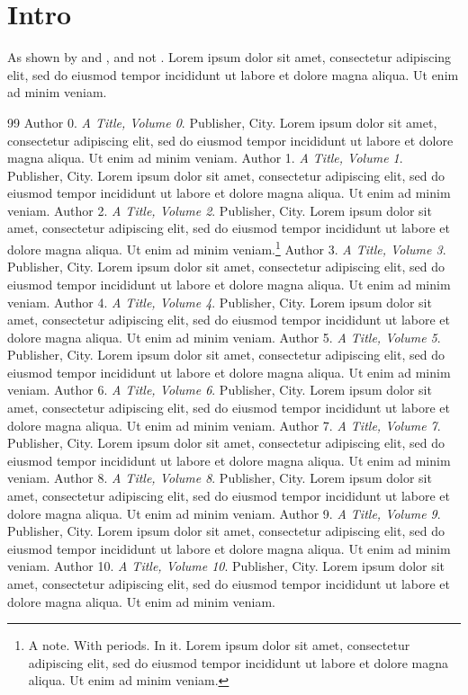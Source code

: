 \documentclass{article}
\begin{document}
\section{Intro}
As shown by \cite{knuth} and \cite{lamport,knuth}, and not \cite{nobody}. Lorem ipsum dolor sit amet, consectetur adipiscing elit, sed do eiusmod tempor incididunt ut labore et dolore magna aliqua. Ut enim ad minim veniam.

\begin{thebibliography}{99}
 Author 0. \emph{A Title, Volume 0}. Publisher, City. Lorem ipsum dolor sit amet, consectetur adipiscing elit, sed do eiusmod tempor incididunt ut labore et dolore magna aliqua. Ut enim ad minim veniam.
 Author 1. \emph{A Title, Volume 1}. Publisher, City. Lorem ipsum dolor sit amet, consectetur adipiscing elit, sed do eiusmod tempor incididunt ut labore et dolore magna aliqua. Ut enim ad minim veniam.
 Author 2. \emph{A Title, Volume 2}. Publisher, City. Lorem ipsum dolor sit amet, consectetur adipiscing elit, sed do eiusmod tempor incididunt ut labore et dolore magna aliqua. Ut enim ad minim veniam.\footnote{A note. With periods. In it. Lorem ipsum dolor sit amet, consectetur adipiscing elit, sed do eiusmod tempor incididunt ut labore et dolore magna aliqua. Ut enim ad minim veniam.}
 Author 3. \emph{A Title, Volume 3}. Publisher, City. Lorem ipsum dolor sit amet, consectetur adipiscing elit, sed do eiusmod tempor incididunt ut labore et dolore magna aliqua. Ut enim ad minim veniam.
 Author 4. \emph{A Title, Volume 4}. Publisher, City. Lorem ipsum dolor sit amet, consectetur adipiscing elit, sed do eiusmod tempor incididunt ut labore et dolore magna aliqua. Ut enim ad minim veniam.
 Author 5. \emph{A Title, Volume 5}. Publisher, City. Lorem ipsum dolor sit amet, consectetur adipiscing elit, sed do eiusmod tempor incididunt ut labore et dolore magna aliqua. Ut enim ad minim veniam.
 Author 6. \emph{A Title, Volume 6}. Publisher, City. Lorem ipsum dolor sit amet, consectetur adipiscing elit, sed do eiusmod tempor incididunt ut labore et dolore magna aliqua. Ut enim ad minim veniam.
 Author 7. \emph{A Title, Volume 7}. Publisher, City. Lorem ipsum dolor sit amet, consectetur adipiscing elit, sed do eiusmod tempor incididunt ut labore et dolore magna aliqua. Ut enim ad minim veniam.
 Author 8. \emph{A Title, Volume 8}. Publisher, City. Lorem ipsum dolor sit amet, consectetur adipiscing elit, sed do eiusmod tempor incididunt ut labore et dolore magna aliqua. Ut enim ad minim veniam.
 Author 9. \emph{A Title, Volume 9}. Publisher, City. Lorem ipsum dolor sit amet, consectetur adipiscing elit, sed do eiusmod tempor incididunt ut labore et dolore magna aliqua. Ut enim ad minim veniam.
 Author 10. \emph{A Title, Volume 10}. Publisher, City. Lorem ipsum dolor sit amet, consectetur adipiscing elit, sed do eiusmod tempor incididunt ut labore et dolore magna aliqua. Ut enim ad minim veniam.
\end{thebibliography}
\end{document}
